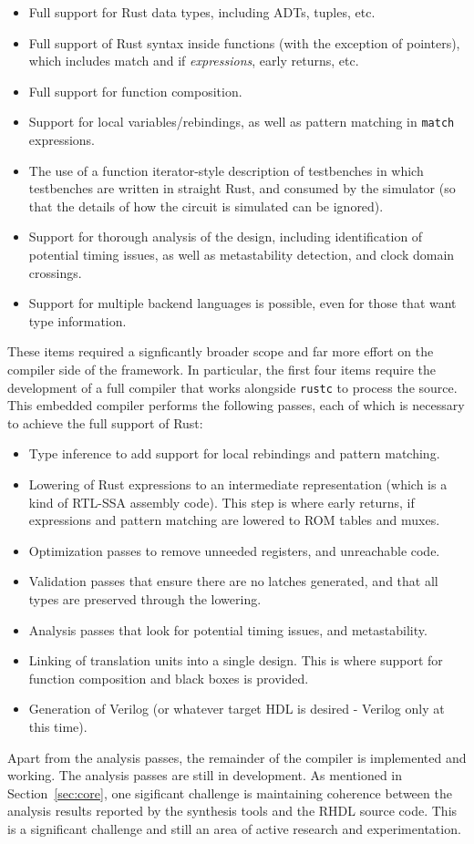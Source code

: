 \documentclass[conference]{IEEEtran}
\begin{document}
\begin{itemize}
  \item Full support for Rust data types, including ADTs, tuples, etc.
  \item Full support of Rust syntax inside functions (with the exception of pointers), which includes 
  match and if \emph{expressions}, early returns, etc.
  \item Full support for function composition.
  \item Support for local variables/rebindings, as well as pattern matching in \verb|match| expressions.
  \item The use of a function iterator-style description of testbenches in which testbenches are written in 
  straight Rust, and consumed by the simulator (so that the details of how the circuit is simulated can be ignored).
  \item Support for thorough analysis of the design, including identification of potential timing issues, as well as
  metastability detection, and clock domain crossings.
  \item Support for multiple backend languages is possible, even for those that want type information.
\end{itemize}

These items required a signficantly broader scope and far more effort on the compiler side of the framework.  In particular,
the first four items require the development of a full compiler that works alongside \verb|rustc| to process the source. 
This embedded compiler performs the following passes, each of which is necessary to achieve the full support of Rust:
\begin {itemize}
  \item Type inference to add support for local rebindings and pattern matching.
  \item Lowering of Rust expressions to an intermediate representation (which is a kind of RTL-SSA assembly code).  This
  step is where early returns, if expressions and pattern matching are lowered to ROM tables and muxes.
  \item Optimization passes to remove unneeded registers, and unreachable code.
  \item Validation passes that ensure there are no latches generated, and that all types are preserved through the lowering.
  \item Analysis passes that look for potential timing issues, and metastability.
  \item Linking of translation units into a single design.  This is where support for function composition and black boxes is
  provided.
  \item Generation of Verilog (or whatever target HDL is desired - Verilog only at this time).
\end{itemize}
Apart from the analysis passes, the remainder of the compiler is implemented and working.  The analysis passes are still in
development.  As mentioned in Section~\ref{sec:core}, one sigificant challenge is maintaining coherence between the analysis 
results reported by the synthesis tools and the RHDL source code.  This is a significant challenge and still an area of 
active research and experimentation.
\end{document}

